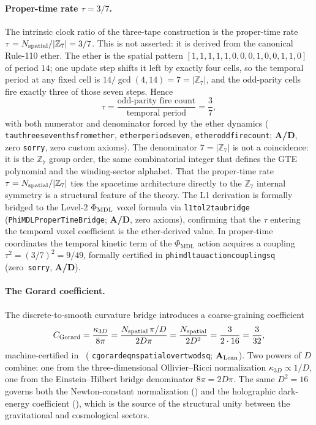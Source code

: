 \documentclass[11pt]{article}
\theoremstyle{remark}
\newcommand{\PHIMDL}{\Phi_{\mathrm{MDL}}}
\newcommand{\ZS}{\mathbb{Z}_7}
\newcommand{\lean}[1]{%
  \penalty-100
  \begingroup\def\_{\textunderscore\allowbreak}\texttt{#1}\endgroup}
\newcommand{\CGorard}{C_{\rm Gorard}}
\newcommand{\CatAL}{\ensuremath{\textbf{A}_{\rm Lean}}}
\newcommand{\CatAD}{\textbf{A/D}}
\begin{document}
\paragraph{Proper-time rate $\tau = 3/7$.}
The intrinsic clock ratio of the three-tape construction is the proper-time rate
$\tau = N_{\rm spatial}/|\ZS| = 3/7$. This is not asserted: it is derived from the
canonical Rule-110 ether. The ether is the spatial pattern
$[1,1,1,1,1,0,0,0,1,0,0,1,1,0]$ of period $14$; one update step shifts it left by
exactly four cells, so the temporal period at any fixed cell is
$14/\gcd(4,14) = 7 = |\ZS|$, and the odd-parity cells fire exactly three of those
seven steps. Hence
\begin{equation}
  \tau = \frac{\text{odd-parity fire count}}{\text{temporal period}} = \frac{3}{7},
  \label{eq:tau}
\end{equation}
with both numerator and denominator forced by the ether dynamics
(\lean{tau\_three\_sevenths\_from\_ether}, \lean{ether\_period\_seven},
\lean{ether\_odd\_fire\_count}; \CatAD, zero \texttt{sorry}, zero custom axioms).
The denominator $7 = |\ZS|$ is not a coincidence: it is the $\ZS$ group order, the
same combinatorial integer that defines the GTE polynomial and the winding-sector
alphabet. That the proper-time rate $\tau = N_{\rm spatial}/|\ZS|$ ties the spacetime
architecture directly to the $\ZS$ internal symmetry is a structural feature of the
theory.
The L1 derivation is formally bridged to the Level-2 $\Phi_{\rm MDL}$ voxel formula via \lean{l1\_to\_l2\_tau\_bridge} (\texttt{PhiMDLProperTimeBridge}; \CatAD, zero axioms), confirming that the $\tau$ entering the temporal voxel coefficient is the ether-derived value.
In proper-time coordinates the temporal kinetic term of the $\PHIMDL$ action
acquires a coupling $\tau^2 = (3/7)^2 = 9/49$, formally certified in
\lean{phimdl\_tau\_action\_coupling\_sq} (zero~\texttt{sorry}, \CatAD).

\paragraph{The Gorard coefficient.}
The discrete-to-smooth curvature bridge introduces a coarse-graining coefficient
\begin{equation}
  \CGorard = \frac{\kappa_{3D}}{8\pi}
  = \frac{N_{\rm spatial}\,\pi/D}{2D\pi}
  = \frac{N_{\rm spatial}}{2D^2}
  = \frac{3}{2\cdot 16} = \frac{3}{32},
  \label{eq:cgorard}
\end{equation}
machine-certified in~\cite{SpivackThreeTapeCMCA}
(\lean{c\_gorard\_eq\_n\_spatial\_over\_two\_dsq}; \CatAL). Two powers of $D$ combine:
one from the three-dimensional Ollivier--Ricci normalization $\kappa_{3D}\propto
1/D$, one from the Einstein--Hilbert bridge denominator $8\pi = 2D\pi$. The same
$D^2 = 16$ governs both the Newton-constant normalization () and the
holographic dark-energy coefficient (), which is the source
of the structural unity between the gravitational and cosmological sectors.
\end{document}
